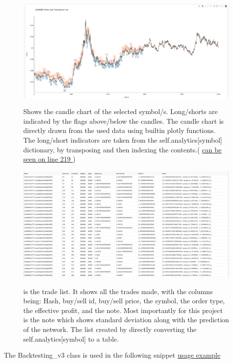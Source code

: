 \documentclass{article}
\begin{document}
\begin{figure}[!h]
\centering
\includegraphics[scale=0.2]{prc_mvt.png}
\label{fig:price movement}
\caption{Shows the candle chart of the selected symbol/s. Long/shorts are indicated by the flags above/below the candles. The candle chart is directly drawn from the used data using builtin plotly functions. The long/short indicators are taken from the self.analytics[symbol] dictionary, by transposing and then indexing the contents.( \href{ https://colab.research.google.com/drive/1KucTlScag3R0D2piUODHtQ1eAmDSQ2Rv#scrollTo=MXbGIyR4KJiJ }{ can be seen on line 219 } ) 
}
\end{figure}



\begin{figure}[!h]
\centering
\includegraphics[scale=0.2]{trade_list.png}
\label{fig:trade list}
\caption{is the trade list. It shows all the trades made, with the columns being: Hash, buy/sell id, buy/sell price, the symbol, the order type, the effective profit, and the note. Most importantly for this project is the note which shows standard deviation along with the prediction of the network. The list created by directly converting the self.analytics[symbol] to a table.}
\end{figure} The Backtesting\_v3 class is used in the following snippet \href{https://colab.research.google.com/drive/1KucTlScag3R0D2piUODHtQ1eAmDSQ2Rv#scrollTo=SftgZAoK6tTp}{usage example}
\\~\\
\end{document}
